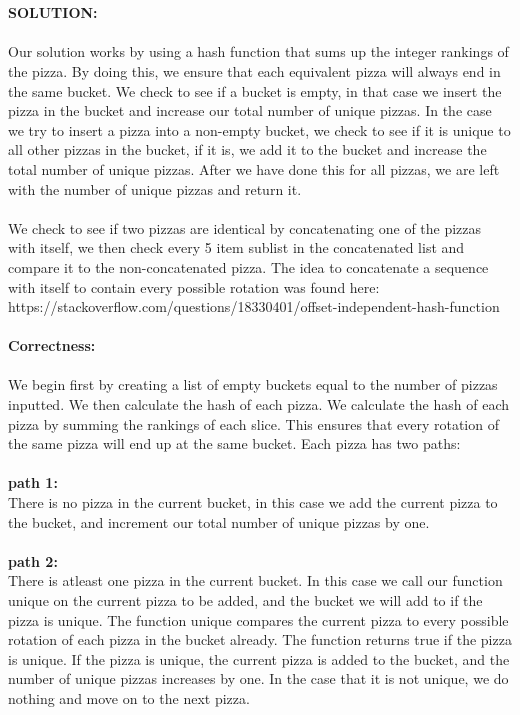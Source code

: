\documentclass{assignment-263}
\begin{document}
\begin{enumerate}
\ \ \ \ \ \ \ 
 

\ \ \ \ \ \ 

\textbf{SOLUTION:}\\\\
Our solution works by using a hash function that sums up the integer rankings of the pizza. By doing this, we ensure that each equivalent pizza will always end in the same bucket. We check to see if a bucket is empty, in that case we insert the pizza in the bucket and increase our total number of unique pizzas. In the case we try to insert a pizza into a non-empty bucket, we check to see if it is unique to all other pizzas in the bucket, if it is, we add it to the bucket and increase the total number of unique pizzas. After we have done this for all pizzas, we are left with the number of unique pizzas and return it.\\\\
We check to see if two pizzas are identical by concatenating one of the pizzas with itself, we then check every 5 item sublist in the concatenated list and compare it to the non-concatenated pizza. The idea to concatenate a sequence with itself to contain every possible rotation was found here:
https://stackoverflow.com/questions/18330401/offset-independent-hash-function\\\\
\textbf{Correctness: }\\\\
We begin first by creating a list of empty buckets equal to the number of pizzas inputted. We then calculate the hash of each pizza. We calculate the hash of each pizza by summing the rankings of each slice. This ensures that every rotation of the same pizza will end up at the same bucket. Each pizza has two paths:\\\\
\textbf{path 1:}\\
There is no pizza in the current bucket, in this case we add the current pizza to the bucket, and increment our total number of unique pizzas by one.\\\\
\textbf{path 2:}\\
There is atleast one pizza in the current bucket. In this case we call our function unique on the current pizza to be added, and the bucket we will add to if the pizza is unique. The function unique compares the current pizza to every possible rotation of each pizza in the bucket already. The function returns true if the pizza is unique. If the pizza is unique, the current pizza is added to the bucket, and the number of unique pizzas increases by one. In the case that it is not unique, we do nothing and move on to the next pizza.\\\\

\end{enumerate}
\end{document}
